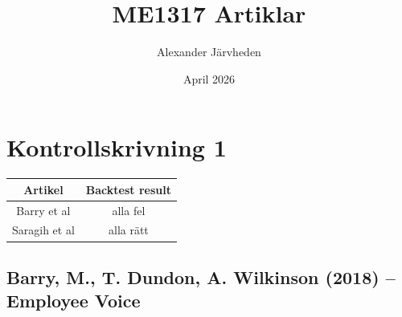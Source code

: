 \documentclass{report}
\title{ME1317 Artiklar}
\author{Alexander Järvheden}
\date{April 2026}
\begin{document}
\maketitle
\chapter{Kontrollskrivning 1}
\begin{table}[ht!]
    \centering
    \Large
    \begin{tabular}{c|c}
        \toprule Artikel & Backtest result \\\midrule
         Barry et al&  alla fel\\
         Saragih et al & alla rätt
    \end{tabular}
\end{table}

\newpage 
\section{Barry, M., T. Dundon, A. Wilkinson (2018) -- Employee Voice}
\end{document}
